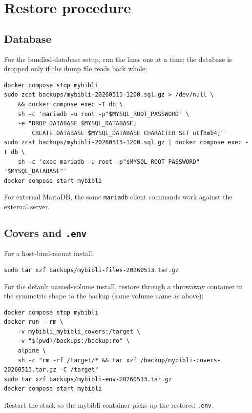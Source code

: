 \section{Restore procedure}

\subsection*{Database}

For the bundled-database setup, run the lines one at a time; the
database is dropped only if the dump file reads back whole:

\begin{lstlisting}
docker compose stop mybibli
sudo zcat backups/mybibli-20260513-1200.sql.gz > /dev/null \
    && docker compose exec -T db \
    sh -c 'mariadb -u root -p"$MYSQL_ROOT_PASSWORD" \
    -e "DROP DATABASE $MYSQL_DATABASE;
        CREATE DATABASE $MYSQL_DATABASE CHARACTER SET utf8mb4;"'
sudo zcat backups/mybibli-20260513-1200.sql.gz | docker compose exec -T db \
    sh -c 'exec mariadb -u root -p"$MYSQL_ROOT_PASSWORD" "$MYSQL_DATABASE"'
docker compose start mybibli
\end{lstlisting}

For external MariaDB, the same \texttt{mariadb} client commands work
against the external server.

\subsection*{Covers and \texttt{.env}}

For a host-bind-mount install:

\begin{lstlisting}
sudo tar xzf backups/mybibli-files-20260513.tar.gz
\end{lstlisting}

For the default named-volume install, restore through a throwaway
container in the symmetric shape to the backup (same volume name as
above):

\begin{lstlisting}
docker compose stop mybibli
docker run --rm \
    -v mybibli_mybibli_covers:/target \
    -v "$(pwd)/backups:/backup:ro" \
    alpine \
    sh -c "rm -rf /target/* && tar xzf /backup/mybibli-covers-20260513.tar.gz -C /target"
sudo tar xzf backups/mybibli-env-20260513.tar.gz
docker compose start mybibli
\end{lstlisting}

Restart the stack so the mybibli container picks up the restored
\texttt{.env}.

